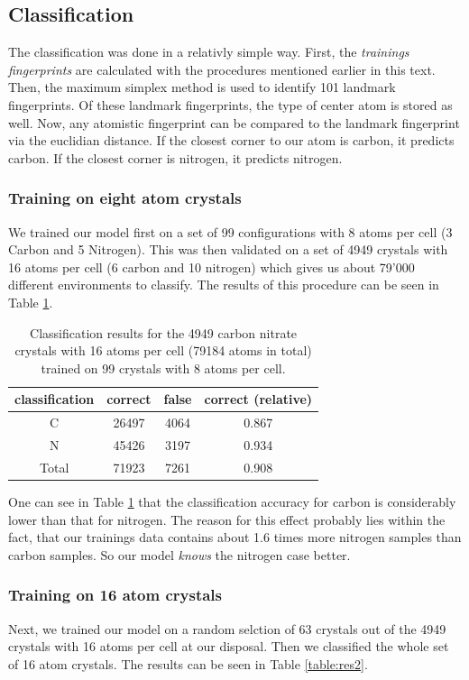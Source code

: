 \newpage
\subsection{Classification}
The classification was done in a relativly simple way. First, the \emph{trainings fingerprints} are calculated with the procedures mentioned earlier in this text. Then, the maximum simplex method is used to identify 101 landmark fingerprints. Of these landmark fingerprints, the type of center atom is stored as well. Now, any atomistic fingerprint can be compared to the landmark fingerprint via the euclidian distance. If the closest corner to our atom is carbon, it predicts carbon. If the closest corner is nitrogen, it predicts nitrogen.\\
\subsubsection{Training on eight atom crystals}
We trained our model first on a set of 99 configurations with 8 atoms per cell (3 Carbon and 5 Nitrogen). This was then validated on a set of 4949 crystals with 16 atoms per cell (6 carbon and 10 nitrogen) which gives us about 79'000 different environments to classify. The results of this procedure can be seen in Table \ref{table:res1}. 

\begin{table}[h!]
\center
\begin{tabular}{c|c|c|c}
classification & correct & false & correct (relative) \\ \hline
C              & 26497   & 4064  & 0.867              \\ \hline
N              & 45426   & 3197  & 0.934              \\ \hline
Total          & 71923   & 7261  & 0.908             
\end{tabular}
\caption{Classification results for the 4949 carbon nitrate crystals with 16 atoms per cell (79184 atoms in total) trained on 99 crystals with 8 atoms per cell.}
\label{table:res1}
\end{table}

One can see in Table \ref{table:res1} that the classification accuracy for carbon is considerably lower than that for nitrogen. The reason for this effect probably lies within the fact, that our trainings data contains about 1.6 times more nitrogen samples than carbon samples. So our model \emph{knows} the nitrogen case better.

\subsubsection{Training on 16 atom crystals}
Next, we trained our model on a random selction of 63 crystals out of the 4949 crystals with 16 atoms per cell at our disposal. Then we classified the whole set of 16 atom crystals. The results can be seen in Table \ref{table:res2}.

